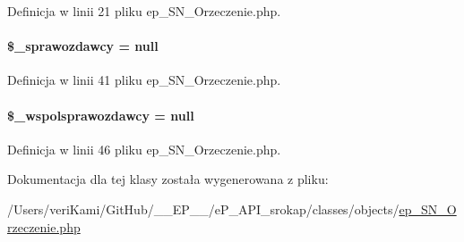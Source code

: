 Definicja w linii 21 pliku ep\-\_\-\-S\-N\-\_\-\-Orzeczenie.\-php.

\hypertarget{classep___s_n___orzeczenie_a714759738f329fda5eebaffc97a6be38}{
\paragraph[{\$\-\_\-sprawozdawcy}]{\setlength{\rightskip}{0pt plus 5cm}\$\-\_\-sprawozdawcy = null\hspace{0.3cm}{\ttfamily [protected]}}}\label{classep___s_n___orzeczenie_a714759738f329fda5eebaffc97a6be38}


Definicja w linii 41 pliku ep\-\_\-\-S\-N\-\_\-\-Orzeczenie.\-php.

\hypertarget{classep___s_n___orzeczenie_ad912d3fe15f8233d48bc2a574708cfc2}{
\paragraph[{\$\-\_\-wspolsprawozdawcy}]{\setlength{\rightskip}{0pt plus 5cm}\$\-\_\-wspolsprawozdawcy = null\hspace{0.3cm}{\ttfamily [protected]}}}\label{classep___s_n___orzeczenie_ad912d3fe15f8233d48bc2a574708cfc2}


Definicja w linii 46 pliku ep\-\_\-\-S\-N\-\_\-\-Orzeczenie.\-php.



Dokumentacja dla tej klasy została wygenerowana z pliku\-:\begin{DoxyCompactItemize}
\item 
/\-Users/veri\-Kami/\-Git\-Hub/\-\_\-\-\_\-\-E\-P\-\_\-\-\_\-/e\-P\-\_\-\-A\-P\-I\-\_\-srokap/classes/objects/\hyperlink{ep___s_n___orzeczenie_8php}{ep\-\_\-\-S\-N\-\_\-\-Orzeczenie.\-php}\end{DoxyCompactItemize}
